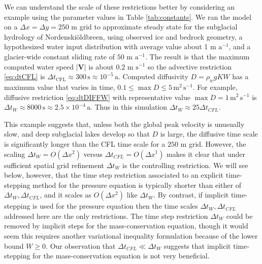 \documentclass[gmd]{copernicus}   %
\newcommand{\text}{\textrm}
\newcommand\bV{\mathbf{V}}
\newcommand{\Nbreen}{Nordenski\"oldbreen\xspace}
\begin{document}
We can understand the scale of these restrictions better by considering an example using the parameter values in Table \ref{tab:constants}.  We ran the model on a $\Delta x = \Delta y = 250$ m grid to approximate steady state for the subglacial hydrology of \Nbreen \citep{vanPeltthesis,vanPeltetal}, using observed ice and bedrock geometry, a hypothesized water input distribution with average value about 1 m $\text{a}^{-1}$, and a glacier-wide constant sliding rate of $50$ m $\text{a}^{-1}$.  The result is that the maximum computed water speed $|\bV|$ is about $0.2$ m $\text{s}^{-1}$ so the advective restriction \eqref{eq:dtCFL} is $\Delta t_{\text{CFL}} \approx 300\,\text{s} \approx 10^{-5}\,\text{a}$.  Computed diffusivity $D = \rho_w g K W$ has a maximum value that varies in time, $0.1 \le \max D \le 5 \,\text{m}^2\,\text{s}^{-1}$.  For example, diffusive restriction \eqref{eq:dtDIFFW} with representative value $\max D=1\,\text{m}^2\,\text{s}^{-1}$ is $\Delta t_W \approx 8000\,\text{s} \approx 2.5 \times 10^{-4}\,\text{a}$.  Thus in this simulation $\Delta t_W \approx 25 \Delta t_{CFL}$.

This example suggests that, unless both the global peak velocity is unusually slow, and deep subglacial lakes develop so that $D$ is large, the diffusive time scale is significantly longer than the CFL time scale for a $250$ m grid.  However, the scaling $\Delta t_W = O(\Delta x^2)$ versus $\Delta t_{CFL} = O(\Delta x^1)$ makes it clear that under sufficient spatial grid refinement $\Delta t_W$ is the controlling restriction.  We will see below, however, that the time step restriction associated to an explicit time-stepping method for the pressure equation is typically shorter than either of $\Delta t_W,\Delta t_{CFL}$, and it scales as $O(\Delta x^2)$ like $\Delta t_W$.  By contrast, if implicit time-stepping is used for the pressure equation \citep{Hewittetal2012,Schoofetal2012} then the time scales $\Delta t_W, \Delta t_{CFL}$ addressed here are the only restrictions.  The time step restriction $\Delta t_W$ could be removed by implicit steps for the mass-conservation equation, though it would seem this requires another variational inequality formulation because of the lower bound $W\ge 0$.  Our observation that $\Delta t_{CFL} \ll \Delta t_W$ suggests that implicit time-stepping for the mass-conservation equation is not very beneficial.
\end{document}
